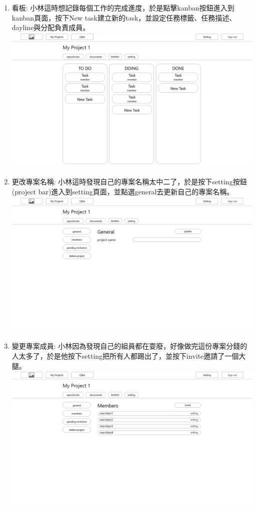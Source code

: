 \documentclass{report}
\begin{document}
\begin{enumerate}[label=(\Alph*)]
  \item 看板: 小林這時想記錄每個工作的完成進度，於是點擊kanban按鈕進入到kanban頁面，按下New task建立新的task，並設定任務標籤、任務描述、dayline與分配負責成員。\\
  \includegraphics[width=\textwidth]{assets/wireframe/My_Projects_kanban.png}
  \item 更改專案名稱: 小林這時發現自己的專案名稱太中二了，於是按下setting按鈕(project bar)進入到setting頁面，並點選general去更新自己的專案名稱。\\
  \includegraphics[width=\textwidth]{assets/wireframe/My_Projects_setting_general.png}
  \item 變更專案成員: 小林因為發現自己的組員都在耍廢，好像做完這份專案分錢的人太多了，於是他按下setting把所有人都踢出了，並按下invite邀請了一個大腿。\\
  \includegraphics[width=\textwidth]{assets/wireframe/My_Projects_setting_members.png}

\end{enumerate}
\end{document}
